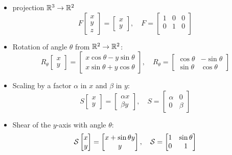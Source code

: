 \documentclass[8pt,dvipsnames]{beamer}
\begin{document}
\begin{frame}
  \begin{itemize}
  \item projection ${\mathbb R}^3\to{\mathbb R}^2$
    $$
    F
    \begin{bmatrix}
      x \\y \\z
    \end{bmatrix}
    =
    \begin{bmatrix}
      x \\y
    \end{bmatrix},\quad F =
    \begin{bmatrix}
      1 & 0 & 0\\
      0 & 1 & 0\\
    \end{bmatrix}
    $$
  \item Rotation of angle $\theta$ from ${\mathbb R}^2\to{\mathbb R}^2$:
    $$
    R_\theta
    \begin{bmatrix}
      x \\y
    \end{bmatrix}
    =
    \begin{bmatrix}
      x\cos\theta - y\sin\theta\\
      x\sin\theta + y\cos\theta
    \end{bmatrix},\quad
    R_\theta =
    \begin{bmatrix}
      \cos\theta & -\sin\theta\\
      \sin\theta & \cos\theta
    \end{bmatrix}
    $$
  \item Scaling by a factor $\alpha$ in $x$ and $\beta$ in $y$:
    $$
    S
    \begin{bmatrix}
     x\\y 
    \end{bmatrix}
    = 
    \begin{bmatrix}
      \alpha x\\
      \beta y
    \end{bmatrix},\quad
    S =
    \begin{bmatrix}
      \alpha & 0\\0 & \beta
    \end{bmatrix}
    $$
  \item Shear of the $y$-axis with  angle $\theta$:
    $$
    {\mathcal S}
    \begin{bmatrix}
      x\\y
    \end{bmatrix}
    =
    \begin{bmatrix}
      x + \sin\theta y\\
      y
    \end{bmatrix},\quad
    {\mathcal S} =
    \begin{bmatrix}
      1 &\sin\theta\\
      0 & 1
    \end{bmatrix}
    $$
  \end{itemize}
\end{frame}
\end{document}
